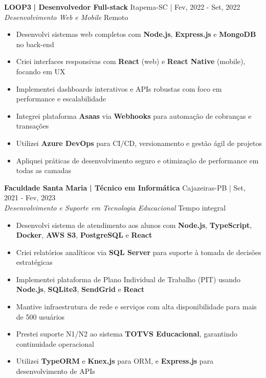 \documentclass[a4paper]{article}
\begin{document}
\textbf{LOOP3}\textbf{ | Desenvolvedor Full-stack} \hfill Itapema-SC | Fev, 2022 - Set, 2022\\
\textit{Desenvolvimento Web e Mobile} \hfill Remoto\\
\vspace{-3mm}
\begin{itemize} \itemsep -3pt
    \item Desenvolvi sistemas web completos com \textbf{Node.js}, \textbf{Express.js} e \textbf{MongoDB} no back-end
    \item Criei interfaces responsivas com \textbf{React} (web) e \textbf{React Native} (mobile), focando em UX
    \item Implementei dashboards interativos e APIs robustas com foco em performance e escalabilidade
    \item Integrei plataforma \textbf{Asaas} via \textbf{Webhooks} para automação de cobranças e transações
    \item Utilizei \textbf{Azure DevOps} para CI/CD, versionamento e gestão ágil de projetos
    \item Apliquei práticas de desenvolvimento seguro e otimização de performance em todas as camadas
\end{itemize}

\textbf{Faculdade Santa Maria}\textbf{ | Técnico em Informática} \hfill Cajazeiras-PB | Set, 2021 - Fev, 2023\\
\textit{Desenvolvimento e Suporte em Tecnologia Educacional} \hfill Tempo integral\\
\vspace{-3mm}
\begin{itemize} \itemsep -3pt
    \item Desenvolvi sistema de atendimento aos alunos com \textbf{Node.js}, \textbf{TypeScript}, \textbf{Docker}, \textbf{AWS S3}, \textbf{PostgreSQL} e \textbf{React}
    \item Criei relatórios analíticos via \textbf{SQL Server} para suporte à tomada de decisões estratégicas
    \item Implementei plataforma de Plano Individual de Trabalho (PIT) usando \textbf{Node.js}, \textbf{SQLite3}, \textbf{SendGrid} e \textbf{React}
    \item Mantive infraestrutura de rede e serviços com alta disponibilidade para mais de 500 usuários
    \item Prestei suporte N1/N2 ao sistema \textbf{TOTVS Educacional}, garantindo continuidade operacional
    \item Utilizei \textbf{TypeORM} e \textbf{Knex.js} para ORM, e \textbf{Express.js} para desenvolvimento de APIs
\end{itemize}
\end{document}
